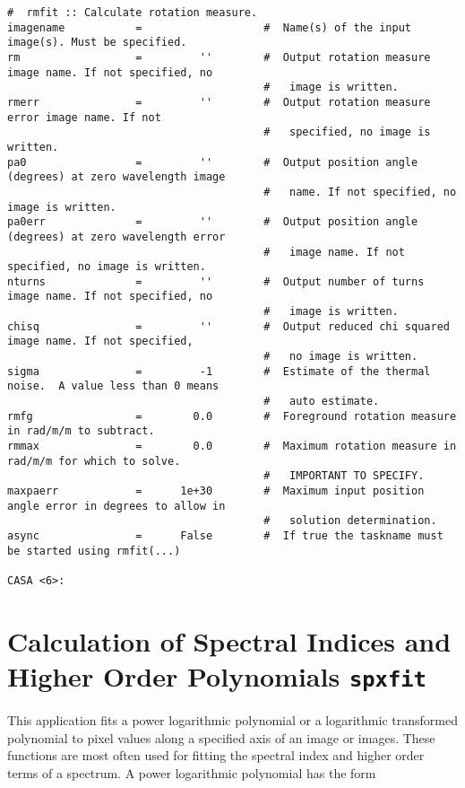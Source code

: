 \small
\begin{verbatim}
#  rmfit :: Calculate rotation measure.
imagename           =                   #  Name(s) of the input image(s). Must be specified.
rm                  =         ''        #  Output rotation measure image name. If not specified, no
                                        #   image is written.
rmerr               =         ''        #  Output rotation measure error image name. If not
                                        #   specified, no image is written.
pa0                 =         ''        #  Output position angle (degrees) at zero wavelength image
                                        #   name. If not specified, no image is written.
pa0err              =         ''        #  Output position angle (degrees) at zero wavelength error
                                        #   image name. If not specified, no image is written.
nturns              =         ''        #  Output number of turns image name. If not specified, no
                                        #   image is written.
chisq               =         ''        #  Output reduced chi squared image name. If not specified,
                                        #   no image is written.
sigma               =         -1        #  Estimate of the thermal noise.  A value less than 0 means
                                        #   auto estimate.
rmfg                =        0.0        #  Foreground rotation measure in rad/m/m to subtract.
rmmax               =        0.0        #  Maximum rotation measure in rad/m/m for which to solve.
                                        #   IMPORTANT TO SPECIFY.
maxpaerr            =      1e+30        #  Maximum input position angle error in degrees to allow in
                                        #   solution determination.
async               =      False        #  If true the taskname must be started using rmfit(...)

CASA <6>: 
\end{verbatim}
\normalsize


\section{Calculation of Spectral Indices and Higher Order Polynomials {\tt spxfit}}
\label{section:analysis.spxfit}

This application fits a power logarithmic polynomial or a logarithmic
transformed polynomial to pixel values along a specified axis of an
image or images. These functions are most often used for fitting the
spectral index and higher order terms of a spectrum. A power
logarithmic polynomial has the form

